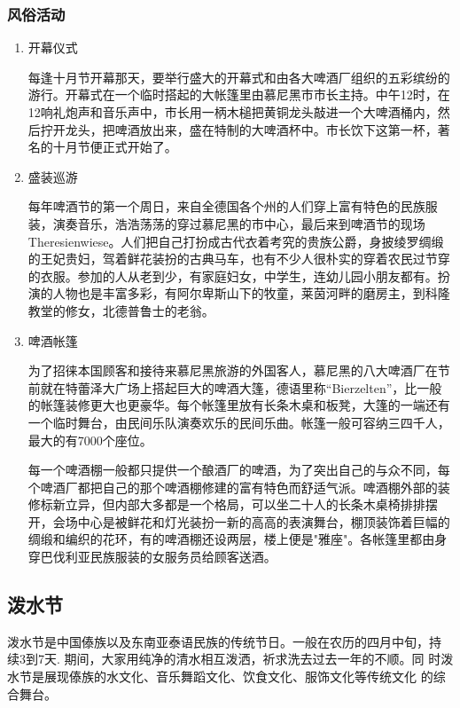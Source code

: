 \subsubsection{风俗活动}
\begin{enumerate}
    
\item 开幕仪式

每逢十月节开幕那天，要举行盛大的开幕式和由各大啤酒厂组织的五彩缤纷的游行。开幕式在一个临时搭起的大帐篷里由慕尼黑市市长主持。中午12时，在12响礼炮声和音乐声中，市长用一柄木槌把黄铜龙头敲进一个大啤酒桶内，然后拧开龙头，把啤酒放出来，盛在特制的大啤酒杯中。市长饮下这第一杯，著名的十月节便正式开始了。

\item 盛装巡游 

每年啤酒节的第一个周日，来自全德国各个州的人们穿上富有特色的民族服装，演奏音乐，浩浩荡荡的穿过慕尼黑的市中心，最后来到啤酒节的现场Theresienwiese。人们把自己打扮成古代衣着考究的贵族公爵，身披绫罗绸缎的王妃贵妇，驾着鲜花装扮的古典马车，也有不少人很朴实的穿着农民过节穿的衣服。参加的人从老到少，有家庭妇女，中学生，连幼儿园小朋友都有。扮演的人物也是丰富多彩，有阿尔卑斯山下的牧童，莱茵河畔的磨房主，到科隆教堂的修女，北德普鲁士的老翁。

\item 啤酒帐篷

为了招徕本国顾客和接待来慕尼黑旅游的外国客人，慕尼黑的八大啤酒厂在节前就在特蕾泽大广场上搭起巨大的啤酒大篷，德语里称“Bierzelten”，比一般的帐篷装修更大也更豪华。每个帐篷里放有长条木桌和板凳，大篷的一端还有一个临时舞台，由民间乐队演奏欢乐的民间乐曲。帐篷一般可容纳三四千人，最大的有7000个座位。

每一个啤酒棚一般都只提供一个酿酒厂的啤酒，为了突出自己的与众不同，每个啤酒厂都把自己的那个啤酒棚修建的富有特色而舒适气派。啤酒棚外部的装修标新立异，但内部大多都是一个格局，可以坐二十人的长条木桌椅排排摆开，会场中心是被鲜花和灯光装扮一新的高高的表演舞台，棚顶装饰着巨幅的绸缎和编织的花环，有的啤酒棚还设两层，楼上便是"雅座"。各帐篷里都由身穿巴伐利亚民族服装的女服务员给顾客送酒。
\end{enumerate}

\subsection{泼水节}

泼水节是中国傣族以及东南亚泰语民族的传统节日。一般在农历的四月中旬，持
续3到7天. 期间，大家用纯净的清水相互泼洒，祈求洗去过去一年的不顺。同
时泼水节是展现傣族的水文化、音乐舞蹈文化、饮食文化、服饰文化等传统文化
的综合舞台。

